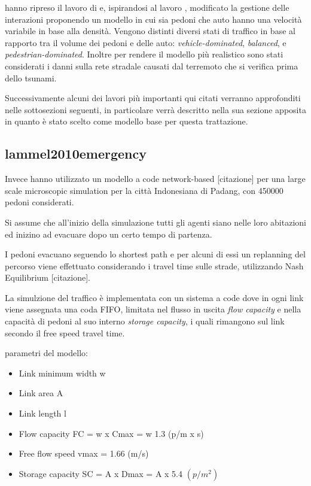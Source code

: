 \textcite{wang2021novel} hanno ripreso il lavoro di \textcite{wang2016agent} e, 
ispirandosi al lavoro \textcite{goto2012tsunami}, modificato la gestione delle interazioni proponendo un modello in cui sia pedoni che auto hanno una velocità variabile in base alla densità.
Vengono distinti diversi stati di traffico in base al rapporto tra il volume dei pedoni e delle auto: \textit{vehicle-dominated}, \textit{balanced}, e \textit{pedestrian-dominated}. 
Inoltre per rendere il modello più realistico sono stati considerati i danni sulla rete stradale causati dal terremoto che si verifica prima dello tsunami.

Successivamente alcuni dei lavori più importanti qui citati verranno approfonditi nelle sottosezioni seguenti,
in particolare \textcite{wang2016agent} verrà descritto nella sua sezione apposita in quanto è stato scelto come modello base per questa trattazione.




\subsection{lammel2010emergency}

Invece hanno utilizzato un modello a code network-based [citazione] per una large scale microscopic simulation
per la città Indonesiana di Padang, con 450000 pedoni considerati.

\vspace*{5mm}

Si assume che all'inizio della simulazione tutti gli agenti siano nelle loro abitazioni ed inizino ad evacuare dopo un certo tempo di partenza.

\vspace*{5mm}

I pedoni evacuano seguendo lo shortest path e per alcuni di essi un replanning del percorso viene effettuato considerando i travel time sulle strade,
utilizzando Nash Equilibrium [citazione].

\vspace*{5mm}

La simulzione del traffico è implementata con un sistema a code dove in ogni link viene assegnata una coda FIFO, 
limitata nel flusso in uscita \textit{flow capacity} e nella capacità di pedoni al suo interno \textit{storage capacity}, i quali
rimangono sul link secondo il free speed travel time.

\vspace*{5mm}

parametri del modello:
\begin{itemize}
    \item Link minimum width w
    \item Link area A
    \item Link length l
    \item Flow capacity FC = w x Cmax = w  1.3 (p/m x s)
    \item Free flow speed vmax = 1.66 (m/s)
    \item Storage capacity SC = A x Dmax = A x 5.4 $(p/m^2)$
\end{itemize}

